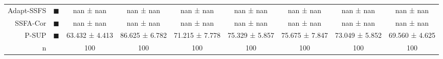 \begin{tabular}{rcccccccc}
Adapt-SSFS &                              \textcolor{ASSFSCMR}{\LARGE $\blacksquare$} &       nan ± nan &       nan ± nan &        nan ± nan &       nan ± nan &       nan ± nan &       nan ± nan &       nan ± nan \\
SSFA-Cor   &                              \textcolor{SFAMCAMT}{\LARGE $\blacksquare$} &       nan ± nan &       nan ± nan &        nan ± nan &       nan ± nan &       nan ± nan &       nan ± nan &       nan ± nan \\
P-SUP      &         \textcolor{PARTIAL_SUPERVISED_CLASSIFIER}{\LARGE $\blacksquare$} &  63.432 ± 4.413 &  86.625 ± 6.782 &   71.215 ± 7.778 &  75.329 ± 5.857 &  75.675 ± 7.847 &  73.049 ± 5.852 &  69.560 ± 4.625 \\
n          &                                                                          &             100 &             100 &              100 &             100 &             100 &             100 &             100 \\
\bottomrule
\end{tabular}
